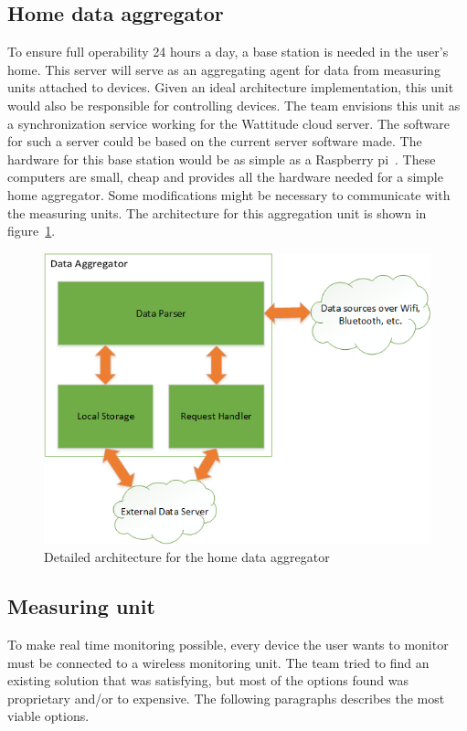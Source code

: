 \subsection{Home data aggregator}
To ensure full operability 24 hours a day, a base station is needed in the user's home. This server will serve as an aggregating agent for data from measuring units attached to devices. Given an ideal architecture implementation, this unit would also be responsible for controlling devices. The team envisions this unit as a synchronization service working for the Wattitude cloud server. The software for such a server could be based on the current server software made. The hardware for this base station would be as simple as a Raspberry pi~\cite{pi}. These computers are small, cheap and provides all the hardware needed for a simple home aggregator. Some modifications might be necessary to communicate with the measuring units. The architecture for this aggregation unit is shown in figure~\ref{fig:aggregator}.

\begin{figure}[H]
\centering
\includegraphics[height=0.4\textheight]{ch/further/fig/home.png}
\caption{Detailed architecture for the home data aggregator}
\label{fig:aggregator}
\end{figure}

\subsection{Measuring unit}
To make real time monitoring possible, every device the user wants to monitor must be connected to a wireless monitoring unit. The team tried to find an existing solution that was satisfying, but most of the options found was proprietary and/or to expensive. The following paragraphs describes the most viable options.

